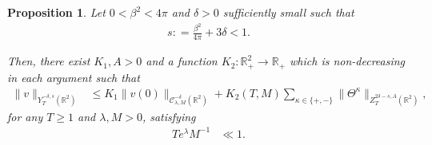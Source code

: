 \documentclass[letterpaper, 11pt,  reqno]{amsart}
\newtheorem{proposition}[theorem]{Proposition}
\theoremstyle{myremark}
\newcommand{\Ta}{\Theta}
\newcommand{\1}{\hspace{0.5mm}\text{I}\hspace{0.5mm}}
\newcommand{\R}{\mathbb{R}}
\newcommand{\CC}{\mathcal{C}}
\newcommand{\be}{\beta}
\newcommand{\dl}{\delta}
\newcommand{\kk}{\kappa}
\newcommand{\ld}{\lambda}
\numberwithin{equation}{section}
\numberwithin{theorem}{section}
\begin{document}
\begin{proposition}\label{PROP:key2}
Let $0 < \be^2 < 4\pi$ and  $\dl >0$ sufficiently small such that
\begin{align}
s: = \frac{\be^2}{4\pi} + 3\dl<1.
\label{cond2}
\end{align}

Then, 
there exist  $K_1, A>0$ and a function  $K_2: \R_+^2 \to \R_+$
which is non-decreasing in each argument
such that
\begin{align}
\|v\|_{Y^{-\dl,s}_T(\R^2)} 
& \le K_1  
\|v(0)\|_{\CC^{-\dl}_{\ld, M}(\R^2)}
 + K_2(T,M)  
\sum_{\kk \in \{+, -\}}
\|\Ta^\kk\|_{Z^{2\dl-s, A}_T(\R^2)},
\label{Z0}
\end{align}
for any  $T\ge 1$ and $\ld,M>0$, satisfying  
\begin{align}
T e^{\ld} M^{-1} & \ll 1.
\label{para2}
\end{align}



\end{proposition}
\end{document}
